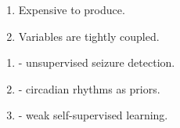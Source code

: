 \documentclass[t]{beamer}
\theoremstyle{definition}
\begin{document}
\begin{frame}
{\begin{tikzpicture}
        

    \end{tikzpicture}
    }
    \begin{enumerate}
         \item<alert@+-> Expensive to produce.
         \item<alert@+-> Variables are tightly coupled.
    \end{enumerate}

     {
    \begin{block}{}
        \begin{enumerate}
            \item \cite{gardner2006one} - unsupervised seizure detection.
            \item \cite{karoly2017circadian} - circadian rhythms as priors.
            \item \cite{yang2022weak} - weak self-supervised learning.
        \end{enumerate}
    \end{block}

    }
    

\end{frame}
\end{document}
